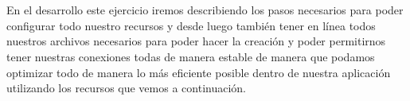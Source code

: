 \documentclass[10pt,a4paper]{article}
\begin{document}
\pagebreak

\section{\color{colorIPN}{Desarrollo y resultados}}


En el desarrollo este ejercicio iremos describiendo los pasos necesarios para poder configurar todo nuestro recursos y desde luego también tener en línea todos nuestros archivos necesarios para poder hacer la creación y poder permitirnos tener nuestras conexiones todas de manera estable de manera que podamos optimizar todo de manera lo más eficiente posible dentro de nuestra aplicación utilizando los recursos que vemos a continuación.
\vspace{5mm}
\end{document}
